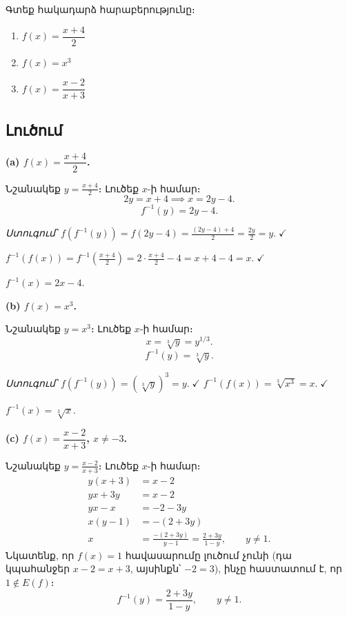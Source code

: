 \documentclass[12pt, a4paper]{article}
\begin{document}
\begin{problembox}
Գտեք հակադարձ հարաբերությունը։
\begin{enumerate}[label=(\alph*), nosep]
  \item $f(x) = \dfrac{x+4}{2}$
  \item $f(x) = x^3$
  \item $f(x) = \dfrac{x-2}{x+3}$
\end{enumerate}
\end{problembox}

\subsection*{Լուծում}

\textbf{(a)\; $f(x) = \dfrac{x+4}{2}$.}

Նշանակեք $y = \frac{x+4}{2}$։ Լուծեք $x$-ի համար։
\[
  2y = x + 4 \implies x = 2y - 4.
\]
\[
  \boxed{f^{-1}(y) = 2y - 4.}
\]

\emph{Ստուգում՝}\; $f(f^{-1}(y)) = f(2y-4) = \frac{(2y-4)+4}{2} = \frac{2y}{2} = y.\;\checkmark$

$f^{-1}(f(x)) = f^{-1}\!\left(\frac{x+4}{2}\right) = 2 \cdot \frac{x+4}{2} - 4 = x + 4 - 4 = x.\;\checkmark$

\begin{answerbox}
$f^{-1}(x) = 2x - 4.$
\end{answerbox}

\bigskip
\textbf{(b)\; $f(x) = x^3$.}

Նշանակեք $y = x^3$։ Լուծեք $x$-ի համար։
\[
  x = \sqrt[3]{y} = y^{1/3}.
\]
\[
  \boxed{f^{-1}(y) = \sqrt[3]{y}.}
\]

\emph{Ստուգում՝}\; $f(f^{-1}(y)) = (\sqrt[3]{y})^3 = y.\;\checkmark$ \quad
$f^{-1}(f(x)) = \sqrt[3]{x^3} = x.\;\checkmark$

\begin{answerbox}
$f^{-1}(x) = \sqrt[3]{x}.$
\end{answerbox}

\bigskip
\textbf{(c)\; $f(x) = \dfrac{x-2}{x+3}$, \quad $x \neq -3$.}

Նշանակեք $y = \frac{x-2}{x+3}$։ Լուծեք $x$-ի համար։
\begin{align*}
  y(x+3) &= x - 2 \\
  yx + 3y &= x - 2 \\
  yx - x &= -2 - 3y \\
  x(y - 1) &= -(2 + 3y) \\
  x &= \frac{-(2+3y)}{y-1} = \frac{2+3y}{1-y}, \qquad y \neq 1.
\end{align*}
Նկատենք, որ $f(x) = 1$ հավասարումը լուծում չունի (դա կպահանջեր $x - 2 = x + 3$, այսինքն՝ $-2 = 3$), ինչը հաստատում է, որ $1 \notin E(f)$։
\[
  \boxed{f^{-1}(y) = \frac{2 + 3y}{1 - y}, \qquad y \neq 1.}
\]
\end{document}
